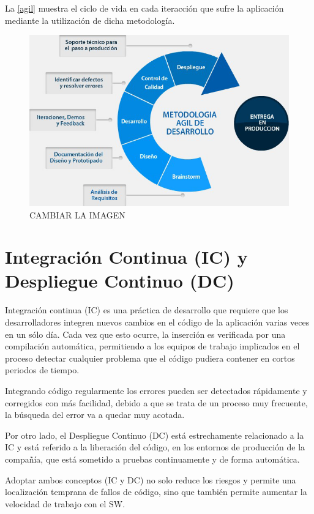 La \autoref{agil} muestra el ciclo de vida en cada iteracción que sufre la aplicación mediante la utilización de dicha metodología.

\begin{figure}[htbp]
	\centering
	\includegraphics[width=1.0\linewidth]
	{tecnica/figuras/agil.png}
	\caption{CAMBIAR LA IMAGEN}
	\label{agil}
\end{figure}

\section{Integración Continua (\gls{IC}) y Despliegue Continuo (\gls{DC})}

Integración continua (\gls{IC}) es una práctica de desarrollo que requiere que los desarrolladores integren nuevos cambios en el código de la aplicación varias veces en un sólo día. Cada vez que esto ocurre, la inserción es verificada por una compilación automática, permitiendo a los equipos de trabajo implicados en el proceso detectar cualquier problema que el código pudiera contener en cortos periodos de tiempo.

Integrando código regularmente los errores pueden ser detectados rápidamente y corregidos con más facilidad, debido a que se trata de un proceso muy frecuente, la búsqueda del error va a quedar muy acotada.

Por otro lado, el Despliegue Continuo (\gls{DC}) está estrechamente relacionado a la \gls{IC} y está referido a la liberación del código, en los entornos de producción de la compañía, que está sometido a pruebas continuamente y de forma automática.

Adoptar ambos conceptos (\gls{IC} y \gls{DC}) no solo reduce los riesgos y permite una localización temprana de fallos de código, sino que también permite aumentar la velocidad de trabajo con el \gls{SW}\cite{IC2017}.

